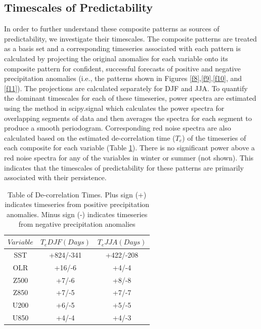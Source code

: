 \documentclass{ametsocV6.1}
\begin{document}
\subsection{Timescales of Predictability}
\label{sec:restimescale}

In order to further understand these composite patterns as sources of predictability, we investigate their timescales.  The composite patterns are treated as a basis set and a corresponding timeseries associated with each pattern is calculated by projecting the original anomalies for each variable onto its composite pattern for confident, successful forecasts of positive and negative precipitation anomalies (i.e., the patterns shown in Figures \ref{f8},\ref{f9},\ref{f10}, and \ref{f11}).  The projections are calculated separately for DJF and JJA. To quantify the dominant timescales for each of these timeseries, power spectra are estimated using the \citet{welch_use_1967} method in scipy.signal \citep{virtanen_scipy_2020} which calculates the power spectra for overlapping segments of data and then averages the spectra for each segment to produce a smooth periodogram.  Corresponding red noise spectra are also calculated based on the estimated de-correlation time ($T_e$) of the timeseries of each composite for each variable (Table \ref{t2}). There is no significant power above a red noise spectra for any of the variables in winter or summer (not shown).  This indicates that the timescales of predictability for these patterns are primarily associated with their persistence.

\begin{table}[t]
\caption{Table of De-correlation Times.  Plus sign (+) indicates timeseries from positive precipitation anomalies.  Minus sign (-) indicates timeseries from negative precipitation anomalies}\label{t2}
\begin{center}
\begin{tabular}{ccc}
\hline\hline
$Variable$ & $T_e DJF (Days)$ & $T_e JJA (Days) $ \\
\hline
SST & +824/-341 & +422/-208 \\
OLR & +16/-6 & +4/-4 \\
Z500 & +7/-6 & +8/-8 \\
Z850 & +7/-5 & +7/-7\\
U200 & +6/-5 & +5/-5 \\
U850 & +4/-4 & +4/-3 \\
\hline
\end{tabular}
\end{center}
\end{table}
\end{document}
